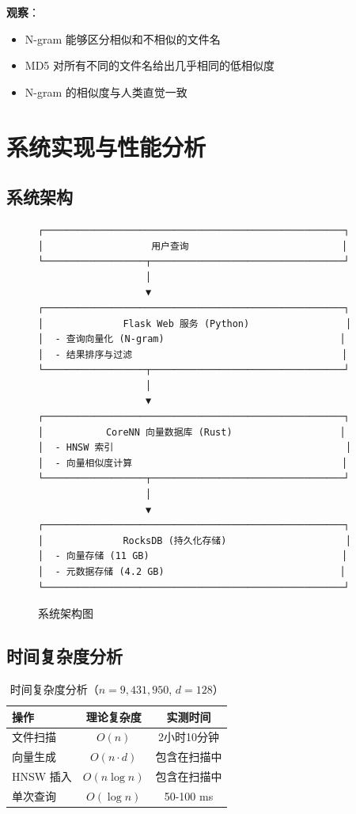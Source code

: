 \documentclass[12pt,a4paper]{article}
\begin{document}
\textbf{观察}：
\begin{itemize}
    \item N-gram 能够区分相似和不相似的文件名
    \item MD5 对所有不同的文件名给出几乎相同的低相似度
    \item N-gram 的相似度与人类直觉一致
\end{itemize}

\section{系统实现与性能分析}

\subsection{系统架构}

\begin{figure}[h]
\centering
\begin{verbatim}
┌─────────────────────────────────────────────────────┐
│                   用户查询                           │
└──────────────────┬──────────────────────────────────┘
                   │
                   ▼
┌─────────────────────────────────────────────────────┐
│              Flask Web 服务 (Python)                 │
│  - 查询向量化 (N-gram)                               │
│  - 结果排序与过滤                                     │
└──────────────────┬──────────────────────────────────┘
                   │
                   ▼
┌─────────────────────────────────────────────────────┐
│           CoreNN 向量数据库 (Rust)                   │
│  - HNSW 索引                                         │
│  - 向量相似度计算                                     │
└──────────────────┬──────────────────────────────────┘
                   │
                   ▼
┌─────────────────────────────────────────────────────┐
│              RocksDB (持久化存储)                     │
│  - 向量存储 (11 GB)                                  │
│  - 元数据存储 (4.2 GB)                               │
└─────────────────────────────────────────────────────┘
\end{verbatim}
\caption{系统架构图}
\end{figure}

\subsection{时间复杂度分析}

\begin{table}[h]
\centering
\begin{tabular}{@{}lcc@{}}
\toprule
\textbf{操作} & \textbf{理论复杂度} & \textbf{实测时间} \\
\midrule
文件扫描 & $O(n)$ & 2小时10分钟 \\
向量生成 & $O(n \cdot d)$ & 包含在扫描中 \\
HNSW 插入 & $O(n \log n)$ & 包含在扫描中 \\
单次查询 & $O(\log n)$ & 50-100 ms \\
\bottomrule
\end{tabular}
\caption{时间复杂度分析（$n = 9,431,950$, $d = 128$）}
\end{table}
\end{document}
